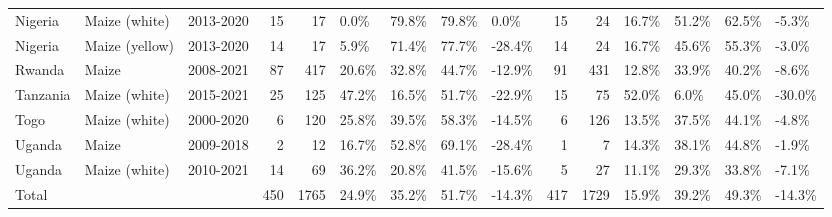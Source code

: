 \begin{table}[ht]
\begin{tabular}{lllrrllllrrllll}
  Nigeria & Maize (white) & 2013-2020 &  15 &  17 & 0.0\% & 79.8\% & 79.8\% & 0.0\% &  15 &  24 & 16.7\% & 51.2\% & 62.5\% & -5.3\% \\ 
  Nigeria & Maize (yellow) & 2013-2020 &  14 &  17 & 5.9\% & 71.4\% & 77.7\% & -28.4\% &  14 &  24 & 16.7\% & 45.6\% & 55.3\% & -3.0\% \\ 
  Rwanda & Maize & 2008-2021 &  87 & 417 & 20.6\% & 32.8\% & 44.7\% & -12.9\% &  91 & 431 & 12.8\% & 33.9\% & 40.2\% & -8.6\% \\ 
  Tanzania & Maize (white) & 2015-2021 &  25 & 125 & 47.2\% & 16.5\% & 51.7\% & -22.9\% &  15 &  75 & 52.0\% & 6.0\% & 45.0\% & -30.0\% \\ 
  Togo & Maize (white) & 2000-2020 &   6 & 120 & 25.8\% & 39.5\% & 58.3\% & -14.5\% &   6 & 126 & 13.5\% & 37.5\% & 44.1\% & -4.8\% \\ 
  Uganda & Maize & 2009-2018 &   2 &  12 & 16.7\% & 52.8\% & 69.1\% & -28.4\% &   1 &   7 & 14.3\% & 38.1\% & 44.8\% & -1.9\% \\ 
  Uganda & Maize (white) & 2010-2021 &  14 &  69 & 36.2\% & 20.8\% & 41.5\% & -15.6\% &   5 &  27 & 11.1\% & 29.3\% & 33.8\% & -7.1\% \\ 
  Total &  &  & 450 & 1765 & 24.9\% & 35.2\% & 51.7\% & -14.3\% & 417 & 1729 & 15.9\% & 39.2\% & 49.3\% & -14.3\% \\ 
   \hline
\end{tabular}
\end{table}
